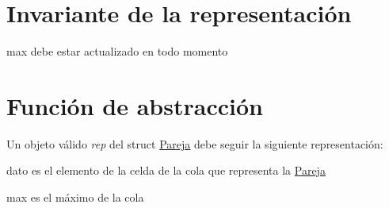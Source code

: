 \hypertarget{repPareja_invPareja}{}\section{Invariante de la representación}\label{repPareja_invPareja}

\begin{DoxyItemize}
\item max debe estar actualizado en todo momento 
\end{DoxyItemize}\hypertarget{repPareja_faPareja}{}\section{Función de abstracción}\label{repPareja_faPareja}
Un objeto válido {\itshape rep} del struct \hyperlink{structPareja}{Pareja} debe seguir la siguiente representación\+:
\begin{DoxyItemize}
\item dato es el elemento de la celda de la cola que representa la \hyperlink{structPareja}{Pareja}
\item max es el máximo de la cola 
\end{DoxyItemize}
